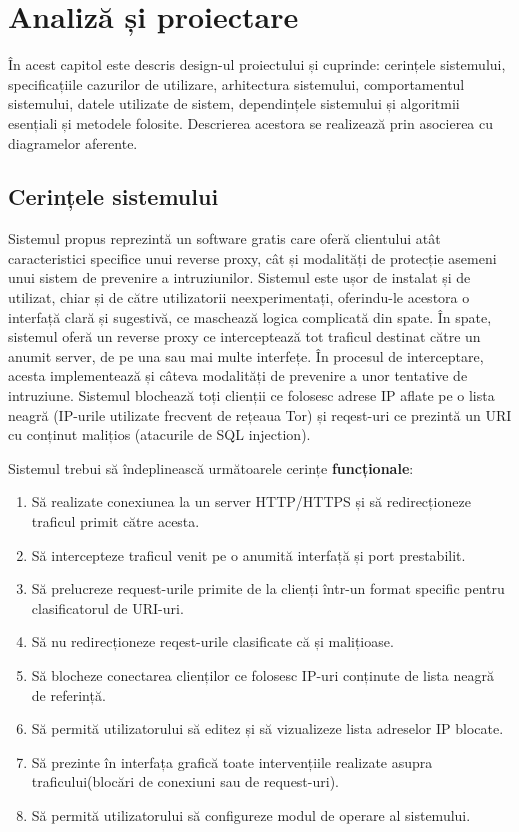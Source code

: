 \chapter{Analiză și proiectare}
\label{cap:analiza-si-proiectare}

În acest capitol este descris design-ul proiectului și cuprinde: cerințele sistemului, specificațiile cazurilor de utilizare, arhitectura sistemului, comportamentul sistemului, datele utilizate de sistem, dependințele sistemului și algoritmii esențiali și metodele folosite. Descrierea acestora se realizează prin asocierea cu diagramelor aferente. 

\section{Cerințele sistemului}

Sistemul propus \textit{\thesistitle}  reprezintă un software gratis care oferă clientului atât caracteristici specifice unui reverse proxy, cât și modalități de protecție asemeni unui sistem de prevenire a intruziunilor. 
Sistemul este ușor de instalat și de utilizat, chiar și de către utilizatorii neexperimentați, oferindu-le acestora o interfață clară și sugestivă, ce maschează logica complicată din spate. În spate, sistemul oferă un reverse proxy ce interceptează tot traficul destinat către un anumit server, de pe una sau mai multe interfețe. În procesul de interceptare, acesta implementează și câteva modalități de prevenire a unor tentative de intruziune. Sistemul blochează toți clienții ce folosesc adrese IP aflate pe o lista neagră (IP-urile utilizate frecvent de rețeaua Tor) și reqest-uri ce prezintă un URI cu conținut malițios (atacurile de SQL injection). 

Sistemul trebui să îndeplinească următoarele cerințe  \textbf{funcționale}:
\begin{enumerate}
	\item Să realizate conexiunea la un server HTTP/HTTPS și să redirecționeze traficul primit către acesta. 
	\item Să intercepteze traficul venit pe o anumită interfață și port prestabilit. 
	\item Să prelucreze request-urile primite de la clienți într-un format specific pentru clasificatorul de URI-uri. 
	\item Să nu redirecționeze reqest-urile clasificate că și malițioase. 
	\item Să blocheze conectarea clienților ce folosesc IP-uri conținute de lista neagră de referință. 
	\item Să permită utilizatorului să editez și să vizualizeze lista adreselor IP blocate. 
	\item Să prezinte în interfața grafică toate intervențiile realizate asupra traficului(blocări de conexiuni sau de request-uri). 
	\item Să permită utilizatorului să configureze modul de operare al sistemului. 
\end{enumerate}

